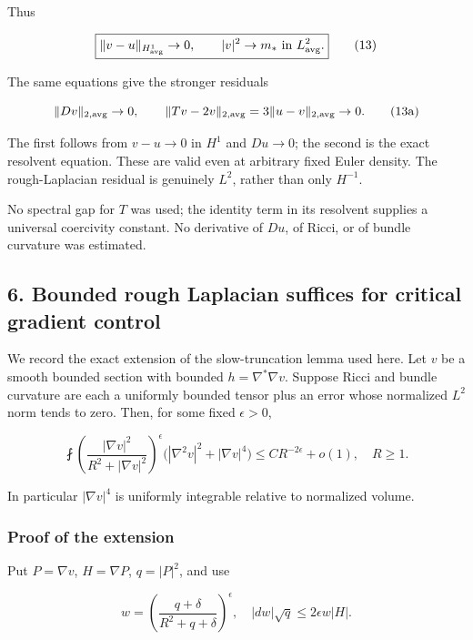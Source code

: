 \documentclass[11pt]{article}
\begin{document}
Thus

\[
 \boxed{\|v-u\|_{H^1_{\rm avg}}\to0,\qquad
               |v|^2\to m_*\text{ in }L^2_{\rm avg}.}\tag{13}
\]

The same equations give the stronger residuals

\[
 \|Dv\|_{2,\rm avg}\to0,\qquad
 \|Tv-2v\|_{2,\rm avg}=3\|u-v\|_{2,\rm avg}\to0.\tag{13a}
\]

The first follows from \(v-u\to0\) in \(H^1\) and \(Du\to0\); the second
is the exact resolvent equation. These are valid even at arbitrary fixed
Euler density. The rough-Laplacian residual is genuinely \(L^2\), rather
than only \(H^{-1}\).

No spectral gap for \(T\) was used; the identity term in its resolvent
supplies a universal coercivity constant. No derivative of \(Du\), of
Ricci, or of bundle curvature was estimated.

\hypertarget{o10strength:bounded-rough-laplacian-suffices-for-critical-gradient-control}{%
\subsection{6. Bounded rough Laplacian suffices for critical gradient
control}\label{o10strength:bounded-rough-laplacian-suffices-for-critical-gradient-control}}

We record the exact extension of the slow-truncation lemma used here.
Let \(v\) be a smooth bounded section with bounded
\(h=\nabla^*\nabla v\). Suppose Ricci and bundle curvature are each a
uniformly bounded tensor plus an error whose normalized \(L^2\) norm
tends to zero. Then, for some fixed \(\epsilon>0\),

\[
 \fint\left(\frac{|\nabla v|^2}{R^2+|\nabla v|^2}\right)^\epsilon
       \bigl(|\nabla^2v|^2+|\nabla v|^4\bigr)
 \le CR^{-2\epsilon}+o(1),\quad R\ge1.
\tag{14}
\]

In particular \(|\nabla v|^4\) is uniformly integrable relative to
normalized volume.

\hypertarget{o10strength:proof-of-the-extension}{%
\subsubsection{Proof of the extension}\label{o10strength:proof-of-the-extension}}

Put \(P=\nabla v\), \(H=\nabla P\), \(q=|P|^2\), and use

\[
 w=\left(\frac{q+\delta}{R^2+q+\delta}\right)^\epsilon,
 \quad |dw|\sqrt q\le2\epsilon w|H|.
\]
\end{document}
